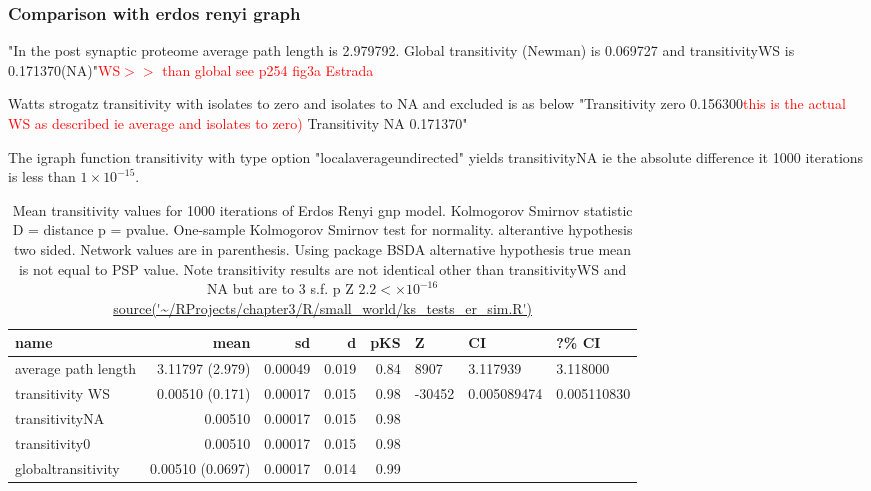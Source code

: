 \clearpage

\subsubsection{Comparison with erdos renyi graph}
"In the post synaptic proteome average path length is 2.979792. Global transitivity (Newman) is 0.069727 and transitivityWS is 0.171370(NA)"\textcolor{red}{WS$>>$ than global see p254 fig3a Estrada}

Watts strogatz transitivity with isolates to zero and isolates to NA and excluded is as below
"Transitivity zero 0.156300\textcolor{red}{this is the actual WS as described ie average and isolates to zero)}   Transitivity NA 0.171370"

The igraph function transitivity with type option "localaverageundirected" yields transitivityNA ie the absolute difference it 1000 iterations is less than $1\times10^{-15}$.

\begin{table}[ht]
\centering
\begin{tabular}{lrrrrlll}
  \hline
name & mean & sd & d & pKS & Z &CI & ?\% CI  \\ 
  \hline
average path length & 3.11797 (2.979) & 0.00049 & 0.019 & 0.84 & 8907 &  3.117939& 3.118000 \\ 
  transitivity WS & 0.00510 (0.171) & 0.00017 & 0.015 & 0.98 &  -30452 & 0.005089474 &0.005110830 \\ 
  transitivityNA & 0.00510 & 0.00017 & 0.015 & 0.98 \\ 
  transitivity0 & 0.00510 & 0.00017 & 0.015 & 0.98 \\ 
  globaltransitivity & 0.00510 (0.0697) & 0.00017 & 0.014 & 0.99 \\ 
   \hline
\end{tabular}
\caption{Mean transitivity values for 1000 iterations of Erdos Renyi gnp model. Kolmogorov Smirnov statistic D = distance p = pvalue. One-sample Kolmogorov Smirnov test for normality. alterantive hypothesis two sided. Network values are in parenthesis. Using package BSDA alternative hypothesis true mean is not equal to PSP value. Note transitivity results are not identical other than transitivityWS and NA but are to 3 s.f. p Z $2.2<\times10^{-16}$ \url{source('~/RProjects/chapter3/R/small_world/ks_tests_er_sim.R')} } 
\label{tab:Mean transitivity values for 1000 iterations of Erdos Renyi gnp model.}
\end{table}


